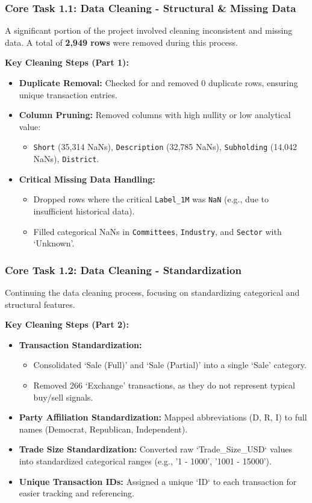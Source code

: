 \documentclass[aspectratio=169]{beamer}
\begin{document}
\begin{frame}
    \frametitle{Core Task 1.1: Data Cleaning - Structural \& Missing Data}
    A significant portion of the project involved cleaning inconsistent and missing data. A total of \textbf{2,949 rows} were removed during this process.

    \textbf{Key Cleaning Steps (Part 1):}
    \begin{itemize}
        \item \textbf{Duplicate Removal:} Checked for and removed 0 duplicate rows, ensuring unique transaction entries.
        \item \textbf{Column Pruning:} Removed columns with high nullity or low analytical value:
        \begin{itemize}
            \item \texttt{Short} (35,314 NaNs), \texttt{Description} (32,785 NaNs), \texttt{Subholding} (14,042 NaNs), \texttt{District}.
        \end{itemize}
        \item \textbf{Critical Missing Data Handling:}
        \begin{itemize}
            \item Dropped rows where the critical \texttt{Label\_1M} was \texttt{NaN} (e.g., due to insufficient historical data).
            \item Filled categorical NaNs in \texttt{Committees}, \texttt{Industry}, and \texttt{Sector} with `Unknown'.
        \end{itemize}
    \end{itemize}
\end{frame}

\begin{frame}
    \frametitle{Core Task 1.2: Data Cleaning - Standardization}
    Continuing the data cleaning process, focusing on standardizing categorical and structural features.

    \textbf{Key Cleaning Steps (Part 2):}
    \begin{itemize}
        \item \textbf{Transaction Standardization:}
        \begin{itemize}
            \item Consolidated `Sale (Full)' and `Sale (Partial)' into a single `Sale' category.
            \item Removed 266 `Exchange' transactions, as they do not represent typical buy/sell signals.
        \end{itemize}
        \item \textbf{Party Affiliation Standardization:} Mapped abbreviations (D, R, I) to full names (Democrat, Republican, Independent).
        \item \textbf{Trade Size Standardization:} Converted raw `Trade\_Size\_USD` values into standardized categorical ranges (e.g., '1 - 1000', '1001 - 15000').
        \item \textbf{Unique Transaction IDs:} Assigned a unique `ID` to each transaction for easier tracking and referencing.
    \end{itemize}
\end{frame}
\end{document}
